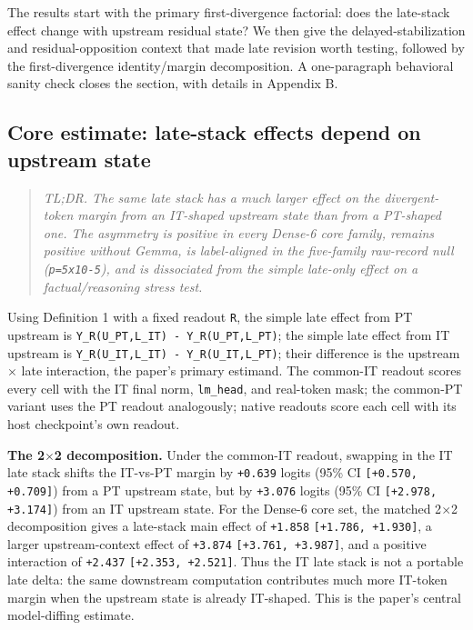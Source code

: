 \documentclass[11pt]{article}
\begin{document}
The results start with the primary first-divergence factorial: does the late-stack effect change with upstream residual state? We then give the delayed-stabilization and residual-opposition context that made late revision worth testing, followed by the first-divergence identity/margin decomposition. A one-paragraph behavioral sanity check closes the section, with details in Appendix B.

\subsection{Core estimate: late-stack effects depend on upstream state}

\begin{quote}
\emph{TL;DR. The same late stack has a much larger effect on the divergent-token margin from an IT-shaped upstream state than from a PT-shaped one. The asymmetry is positive in every Dense-6 core family, remains positive without Gemma, is label-aligned in the five-family raw-record null (\texttt{p=5x10-5}), and is dissociated from the simple late-only effect on a factual/reasoning stress test.}
\end{quote}

Using Definition 1 with a fixed readout \texttt{R}, the simple late effect from PT upstream is \texttt{Y\_R(U\_PT,L\_IT) - Y\_R(U\_PT,L\_PT)}; the simple late effect from IT upstream is \texttt{Y\_R(U\_IT,L\_IT) - Y\_R(U\_IT,L\_PT)}; their difference is the upstream \ensuremath{\times} late interaction, the paper's primary estimand. The common-IT readout scores every cell with the IT final norm, \texttt{lm\_head}, and real-token mask; the common-PT variant uses the PT readout analogously; native readouts score each cell with its host checkpoint's own readout.

\textbf{The 2\ensuremath{\times}2 decomposition.} Under the common-IT readout, swapping in the IT late stack shifts the IT-vs-PT margin by \texttt{+0.639} logits (95\% CI \texttt{[+0.570, +0.709]}) from a PT upstream state, but by \texttt{+3.076} logits (95\% CI \texttt{[+2.978, +3.174]}) from an IT upstream state. For the Dense-6 core set, the matched 2\ensuremath{\times}2 decomposition gives a late-stack main effect of \texttt{+1.858} \texttt{[+1.786, +1.930]}, a larger upstream-context effect of \texttt{+3.874} \texttt{[+3.761, +3.987]}, and a positive interaction of \texttt{+2.437} \texttt{[+2.353, +2.521]}. Thus the IT late stack is not a portable late delta: the same downstream computation contributes much more IT-token margin when the upstream state is already IT-shaped. This is the paper's central model-diffing estimate.
\end{document}
